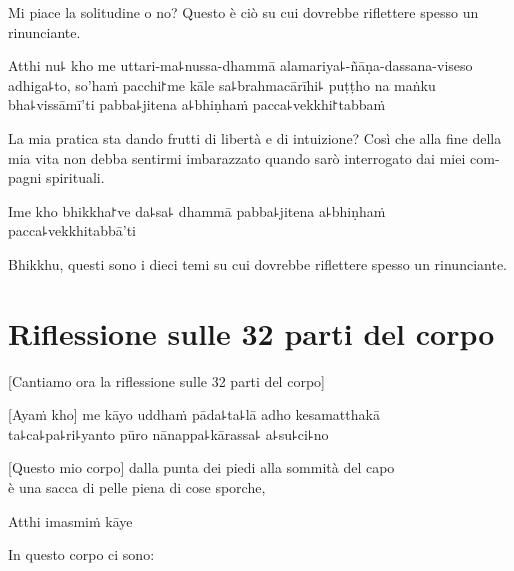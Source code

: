 \begin{english}
Mi piace la solitudine o no?  
Questo è ciò su cui dovrebbe riflettere spesso un rinunciante.
\end{english}

Atthi nu꜕ kho me uttari-ma꜕nussa-dhammā alamariya꜕-ñāṇa-dassana-viseso adhiga꜕to, so'haṁ pacchi꜓me kāle sa꜕brahmacārīhi꜕ puṭṭho na maṅku bha꜕vissāmī'ti pabba꜕jitena a꜕bhiṇhaṁ pacca꜕vekkhi꜓tabbaṁ

\begin{english}
La mia pratica sta dando frutti di libertà e di intuizione?
 Così che alla fine della mia vita non debba sentirmi imbarazzato
  quando sarò interrogato dai miei compagni spirituali.
\end{english}

Ime kho bhikkha꜓ve da꜕sa꜕ dhammā pabba꜕jitena a꜕bhiṇhaṁ pacca꜕vekkhitabbā'ti

\begin{english}
Bhikkhu, questi sono i dieci temi su cui dovrebbe riflettere spesso un rinunciante.
\end{english}

\chapter[Le 32 parti]{Riflessione sulle 32 parti del corpo}


\begin{leader}
\end{leader}

\begin{english}
  [Cantiamo ora la riflessione sulle 32 parti del corpo]
\end{english}

[Ayaṁ kho] me kāyo uddhaṁ pāda꜕ta꜕lā adho kesamatthakā\\
ta꜕ca꜕pa꜕ri꜕yanto pūro nānappa꜕kārassa꜕ a꜕su꜕ci꜕no

\begin{english}
[Questo mio corpo] dalla punta dei piedi alla sommità del capo\\
 è una sacca di pelle piena di cose sporche,
\end{english}

Atthi imasmiṁ kāye

\begin{english}
In questo corpo ci sono:
\end{english}

